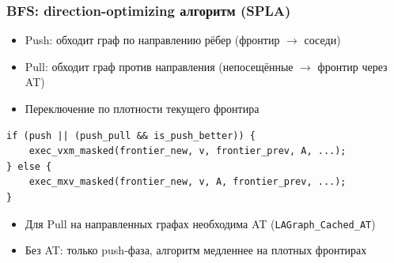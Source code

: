 \documentclass{beamer}
\begin{document}
\begin{frame}[fragile]
  \frametitle{BFS: direction-optimizing алгоритм (SPLA)}
  \begin{itemize}
    \item Push: обходит граф по направлению рёбер (фронтир $\rightarrow$ соседи)
    \item Pull: обходит граф против направления (непосещённые $\rightarrow$ фронтир через AT)
    \item Переключение по плотности текущего фронтира
  \end{itemize}
\begin{Verbatim}[fontsize=\scriptsize]
if (push || (push_pull && is_push_better)) {
    exec_vxm_masked(frontier_new, v, frontier_prev, A, ...);
} else {
    exec_mxv_masked(frontier_new, v, A, frontier_prev, ...);
}
\end{Verbatim}
  \begin{itemize}
    \item Для Pull на направленных графах необходима AT (\texttt{LAGraph\_Cached\_AT})
    \item Без AT: только push-фаза, алгоритм медленнее на плотных фронтирах
  \end{itemize}
\end{frame}
\end{document}
